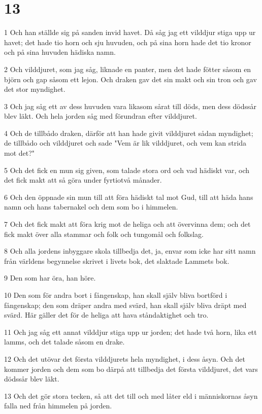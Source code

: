 \chapter{13}

\par 1 Och han ställde sig på sanden invid havet. Då såg jag ett vilddjur stiga upp ur havet; det hade tio horn och sju huvuden, och på sina horn hade det tio kronor och på sina huvuden hädiska namn.
\par 2 Och vilddjuret, som jag såg, liknade en panter, men det hade fötter såsom en björn och gap såsom ett lejon. Och draken gav det sin makt och sin tron och gav det stor myndighet.
\par 3 Och jag såg ett av dess huvuden vara likasom sårat till döds, men dess dödssår blev läkt. Och hela jorden såg med förundran efter vilddjuret.
\par 4 Och de tillbådo draken, därför att han hade givit vilddjuret sådan myndighet; de tillbådo och vilddjuret och sade "Vem är lik vilddjuret, och vem kan strida mot det?"
\par 5 Och det fick en mun sig given, som talade stora ord och vad hädiskt var, och det fick makt att så göra under fyrtiotvå månader.
\par 6 Och den öppnade sin mun till att föra hädiskt tal mot Gud, till att häda hans namn och hans tabernakel och dem som bo i himmelen.
\par 7 Och det fick makt att föra krig mot de heliga och att övervinna dem; och det fick makt över alla stammar och folk och tungomål och folkslag.
\par 8 Och alla jordens inbyggare skola tillbedja det, ja, envar som icke har sitt namn från världens begynnelse skrivet i livets bok, det slaktade Lammets bok.
\par 9 Den som har öra, han höre.
\par 10 Den som för andra bort i fångenskap, han skall själv bliva bortförd i fångenskap; den som dräper andra med svärd, han skall själv bliva dräpt med svärd. Här gäller det för de heliga att hava ståndaktighet och tro.
\par 11 Och jag såg ett annat vilddjur stiga upp ur jorden; det hade två horn, lika ett lamms, och det talade såsom en drake.
\par 12 Och det utövar det första vilddjurets hela myndighet, i dess åsyn. Och det kommer jorden och dem som bo därpå att tillbedja det första vilddjuret, det vars dödssår blev läkt.
\par 13 Och det gör stora tecken, så att det till och med låter eld i människornas åsyn falla ned från himmelen på jorden.
